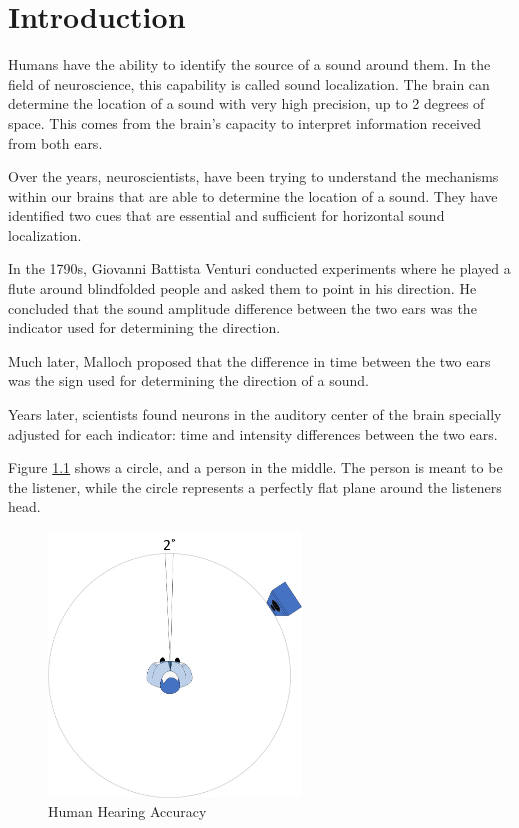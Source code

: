 \chapter{Introduction}\label{ch:introduction}
Humans have the ability to identify the source of a sound around them. In the 
field of neuroscience, this capability is called sound localization. The brain
can determine the location of a sound with very high precision, up to 2 degrees 
of space. This comes from the brain's capacity to interpret information received
from both ears.

Over the years, neuroscientists, have been trying to understand the mechanisms 
within our brains that are able to determine the location of a sound. They have 
identified two cues that are essential and sufficient for horizontal sound
localization.

In the 1790s, Giovanni Battista Venturi conducted experiments where he played a 
flute around blindfolded people and asked them to point in his direction. 
He concluded that the sound amplitude difference between the two ears was the 
indicator used for determining the direction.

Much later, Malloch proposed that the difference in time between the two ears 
was the sign used for determining the direction of a sound.

Years later, scientists found neurons in the auditory center of the brain
specially adjusted for each indicator: time and intensity differences between 
the two ears.

\newpage

Figure \ref{fig:humanHearingAccuracy} shows a circle, and a person in the middle. 
The person is meant to be the listener, while the circle represents a perfectly 
flat plane around the listeners head.
 
\begin{figure}[htp]
	\centering
	\includegraphics[width = 0.6\textwidth]{Illustrations/personHearingAccuracy.jpg}
	\caption{Human Hearing Accuracy}
	\label{fig:humanHearingAccuracy}
\end{figure}

